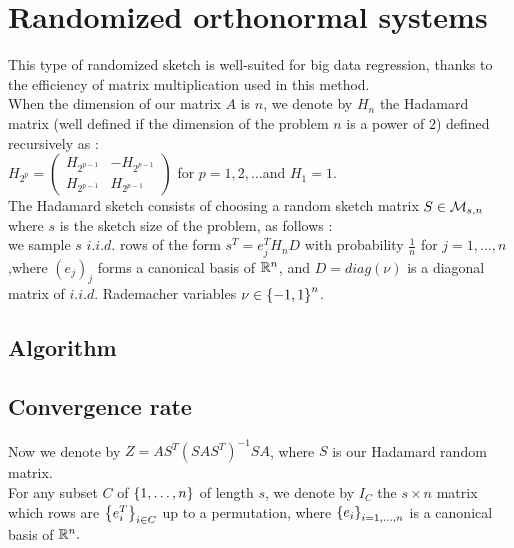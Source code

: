  

 

\chapter{Randomized orthonormal systems}

This type of randomized sketch is well-suited for big data regression, thanks to the efficiency of matrix multiplication used in this method.\\
When the dimension of our matrix $A$ is $n$, we denote by $H_{n}$ the Hadamard matrix (well defined if the dimension of the problem $n$ is a power of $2$) defined recursively as :\\

$H_{2^{p}} = \begin{pmatrix} H_{2^{p-1}} & - H_{2^{p-1}} \\
					H_{2^{p-1}} & H_{2^{p-1}}  \end{pmatrix} $ for $p=1,2,\dots$and $H_{1} = 1.$\\

The Hadamard sketch consists of choosing a random sketch matrix $S \in {\mathcal M}_{s,n}$ where $s$ is the sketch size of the problem, as follows :\\ 
we sample $s$ $i.i.d.$ rows of the form $s^{T} = e_{j}^{T}H_{n} D $ with probability $\frac 1n$ for $j = 1,\dots,n$,where $(e_{j})_{j}$ forms a canonical basis of ${\mathbb R}^{n}$, and $D = diag(\nu)$ is a diagonal matrix of $i.i.d.$ Rademacher variables $\nu \in \left\{-1,1\right\}^{n}$.  


\section{Algorithm}


\section{Convergence rate}



Now we denote by $Z = A S^{T} (S A S^{T})^{-1} S A$, where $S$ is our Hadamard random matrix.\\
For any subset $C$ of $\left\{1,\dots,n\right\}$ of length $s$, we denote by $I_{C}$ the $s\times n$ matrix which rows are $\left\{e_{i}^{T}\right\}_{i\in C}$ up to a permutation, where $\left\{e_{i}\right\}_{i=1,\dots,n}$ is a canonical basis of ${\mathbb R}^{n}.$\\ 

